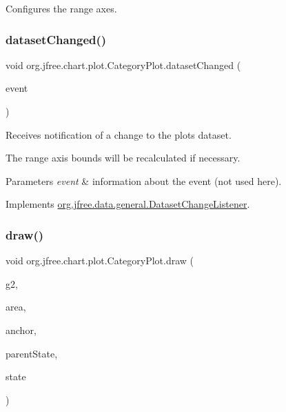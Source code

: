 Configures the range axes. \mbox{\label{classorg_1_1jfree_1_1chart_1_1plot_1_1_category_plot_a18c1d4bbfe9b7646dc1e51246e5c11ff}} 
\subsubsection{\texorpdfstring{dataset\+Changed()}{datasetChanged()}}
{\footnotesize\ttfamily void org.\+jfree.\+chart.\+plot.\+Category\+Plot.\+dataset\+Changed (\begin{DoxyParamCaption}\item[{\mbox{\hyperlink{classorg_1_1jfree_1_1data_1_1general_1_1_dataset_change_event}{Dataset\+Change\+Event}}}]{event }\end{DoxyParamCaption})}

Receives notification of a change to the plot\textquotesingle{}s dataset. 

The range axis bounds will be recalculated if necessary.


\begin{DoxyParams}{Parameters}
{\em event} & information about the event (not used here). \\
\hline
\end{DoxyParams}


Implements \mbox{\hyperlink{interfaceorg_1_1jfree_1_1data_1_1general_1_1_dataset_change_listener_a26ca53969f0dfa539f52e846a3cd72fe}{org.\+jfree.\+data.\+general.\+Dataset\+Change\+Listener}}.

\mbox{\label{classorg_1_1jfree_1_1chart_1_1plot_1_1_category_plot_ac32fc9b28844db99ced138bd570596c3}} 
\subsubsection{\texorpdfstring{draw()}{draw()}}
{\footnotesize\ttfamily void org.\+jfree.\+chart.\+plot.\+Category\+Plot.\+draw (\begin{DoxyParamCaption}\item[{Graphics2D}]{g2,  }\item[{Rectangle2D}]{area,  }\item[{Point2D}]{anchor,  }\item[{\mbox{\hyperlink{classorg_1_1jfree_1_1chart_1_1plot_1_1_plot_state}{Plot\+State}}}]{parent\+State,  }\item[{\mbox{\hyperlink{classorg_1_1jfree_1_1chart_1_1plot_1_1_plot_rendering_info}{Plot\+Rendering\+Info}}}]{state }\end{DoxyParamCaption})}

